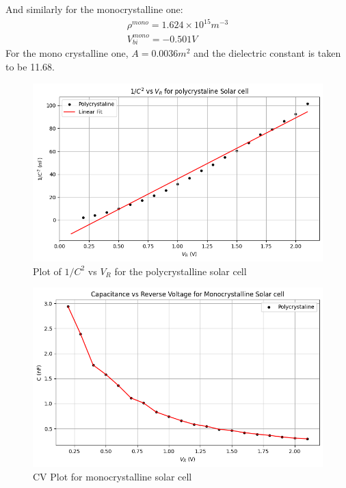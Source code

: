 \documentclass{article}
\begin{document}
\begin{multicols}{2}
And similarly for the monocrystalline one:
\begin{eqnarray}
    \rho^{mono} = 1.624 \times 10^{15} m^{-3} \\
    V_{bi}^{mono} = -0.501 V
\end{eqnarray}
For the mono crystalline one, $A = 0.0036 m^2$ and the dielectric constant is taken to be 11.68.




\begin{figure}[H]
    \centering
    \includegraphics[width=\columnwidth]{Images/CV_poly_2.png}
    \caption{Plot of $1/C^2$ vs $V_R$ for the polycrystalline solar cell}
    \label{CV_poly_2}
\end{figure}



\begin{figure}[H]
    \centering
    \includegraphics[width=\columnwidth]{Images/CV_mono_1.png}
    \caption{CV Plot for monocrystalline solar cell}
    \label{CV_mono_1}
\end{figure}




\end{multicols}
\end{document}
